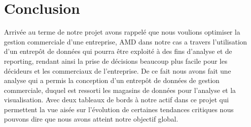 \chapter*{Conclusion}

Arrivée au terme de notre projet avons rappelé que nous voulions optimiser la gestion commerciale d’une entreprise, AMD dans notre cas a travers l’utilisation d’un entrepôt de données qui pourra être exploité à des fins d’analyse et de reporting, rendant ainsi la prise de décisions beaucoup plus facile pour les décideurs et les commerciaux de l’entreprise. De ce fait nous avons fait une analyse qui a permis la conception d’un entrepôt de données de gestion commerciale, duquel est ressorti les magasins de données pour l’analyse et la visualisation. Avec deux tableaux de bords à notre actif dans ce projet qui permettent la vue aisée sur l’évolution de certaines tendances critiques nous pouvons dire que nous avons atteint notre objectif global.
